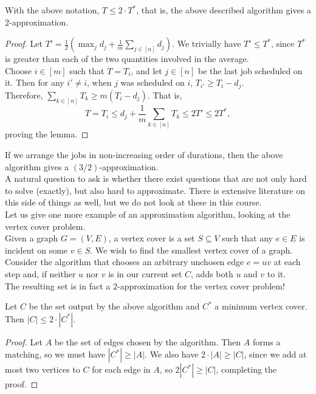 	\begin{lemma}
		With the above notation, $T \leq 2\cdot T^*$, that is, the above described algorithm gives a $2$-approximation.
	\end{lemma}
	\begin{proof}
		Let $T' = \frac{1}{2} \left(\max_j d_j + \frac{1}{m} \sum_{j\in[n]} d_j\right)$. We trivially have $T' \leq T^*$, since $T^*$ is greater than each of the two quantities involved in the average.\\
		Choose $i\in[m]$ such that $T = T_i$, and let $j\in[n]$ be the last job scheduled on it. Then for any $i' \neq i$, when $j$ was scheduled on $i$, $T_{i'} \geq T_i - d_j$.\\
		Therefore, $\sum_{k\in[n]} T_k \geq m(T_i - d_j)$. That is,
		\[ T = T_i \leq d_j + \frac{1}{m} \sum_{k\in[n]} T_k \leq 2T' \leq 2T^*, \]
		proving the lemma.
	\end{proof}

	If we arrange the jobs in non-increasing order of durations, then the above algorithm gives a $(3/2)$-approximation.\\

	A natural question to ask is whether there exist questions that are not only hard to solve (exactly), but also hard to approximate. There is extensive literature on this side of things as well, but we do not look at these in this course.\\

	Let us give one more example of an approximation algorithm, looking at the vertex cover problem.\\
	Given a graph $G=(V,E)$, a vertex cover is a set $S\subseteq V$ such that any $e\in E$ is incident on some $v \in S$. We wish to find the smallest vertex cover of a graph.\\

	Consider the algorithm that chooses an arbitrary unchosen edge $e=uv$ at each step and, if neither $u$ nor $v$ is in our current set $C$, adds both $u$ and $v$ to it.\\
	The resulting set is in fact a $2$-approximation for the vertex cover problem!

	\begin{lemma}
		Let $C$ be the set output by the above algorithm and $C^*$ a minimum vertex cover. Then $|C| \leq 2\cdot|C^*|$.
	\end{lemma}
	\begin{proof}
		Let $A$ be the set of edges chosen by the algorithm. Then $A$ forms a matching, so we must have $|C^*| \geq |A|$. We also have $2\cdot|A| \geq |C|$, since we add at most two vertices to $C$ for each edge in $A$, so $2|C^*| \geq |C|$, completing the proof.
	\end{proof}